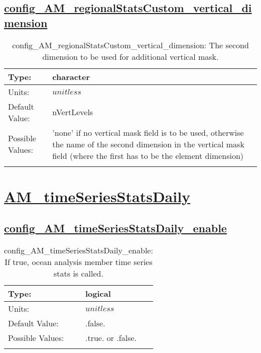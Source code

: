 \subsection[config\_AM\_regionalStatsCustom\_vertical\_dimension]{\hyperref[sec:nm_tab_AM_regionalStatsCustom]{config\_AM\_regionalStatsCustom\_vertical\_dimension}}
\label{subsec:nm_sec_config_AM_regionalStatsCustom_vertical_dimension}
\begin{center}
\begin{longtable}{| p{2.0in} || p{4.0in} |}
    \hline
    Type: & character \\
    \hline
    Units: & $unitless$ \\
    \hline
    Default Value: & nVertLevels \\
    \hline
    Possible Values: & 'none' if no vertical mask field is to be used, otherwise the name of the second dimension in the vertical mask field (where the first has to be the element dimension) \\
    \hline
    \caption{config\_AM\_regionalStatsCustom\_vertical\_dimension: The second dimension to be used for additional vertical mask.}
\end{longtable}
\end{center}
\section[AM\_timeSeriesStatsDaily]{\hyperref[sec:nm_tab_AM_timeSeriesStatsDaily]{AM\_timeSeriesStatsDaily}}
\label{sec:nm_sec_AM_timeSeriesStatsDaily}
\subsection[config\_AM\_timeSeriesStatsDaily\_enable]{\hyperref[sec:nm_tab_AM_timeSeriesStatsDaily]{config\_AM\_timeSeriesStatsDaily\_enable}}
\label{subsec:nm_sec_config_AM_timeSeriesStatsDaily_enable}
\begin{center}
\begin{longtable}{| p{2.0in} || p{4.0in} |}
    \hline
    Type: & logical \\
    \hline
    Units: & $unitless$ \\
    \hline
    Default Value: & .false. \\
    \hline
    Possible Values: & .true. or .false. \\
    \hline
    \caption{config\_AM\_timeSeriesStatsDaily\_enable: If true, ocean analysis member time series stats is called.}
\end{longtable}
\end{center}

